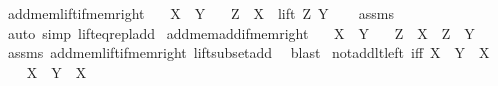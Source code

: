 \begin{isabellebody}
\endisatagproof
{\isafoldproof}%
%
\isadelimproof
\isanewline
%
\endisadelimproof
\isanewline
{}\isamarkupfalse%
\ add{\isacharunderscore}{\kern0pt}mem{\isacharunderscore}{\kern0pt}lift{\isacharunderscore}{\kern0pt}if{\isacharunderscore}{\kern0pt}mem{\isacharunderscore}{\kern0pt}right{\isacharcolon}{\kern0pt}\isanewline
\ \ \ {\isachardoublequoteopen}X\ {\isasymin}\ Y{\isachardoublequoteclose}\isanewline
\ \ \ {\isachardoublequoteopen}Z\ {\isacharplus}{\kern0pt}\ X\ {\isasymin}\ lift\ Z\ Y{\isachardoublequoteclose}\isanewline
%
\isadelimproof
\ \ %
\endisadelimproof
%
\isatagproof
{}\isamarkupfalse%
\ assms\ \isamarkupfalse%
\ {\isacharparenleft}{\kern0pt}auto\ simp{\isacharcolon}{\kern0pt}\ lift{\isacharunderscore}{\kern0pt}eq{\isacharunderscore}{\kern0pt}repl{\isacharunderscore}{\kern0pt}add{\isacharparenright}{\kern0pt}%
\endisatagproof
{\isafoldproof}%
%
\isadelimproof
\isanewline
%
\endisadelimproof
\isanewline
{}\isamarkupfalse%
\ add{\isacharunderscore}{\kern0pt}mem{\isacharunderscore}{\kern0pt}add{\isacharunderscore}{\kern0pt}if{\isacharunderscore}{\kern0pt}mem{\isacharunderscore}{\kern0pt}right{\isacharcolon}{\kern0pt}\isanewline
\ \ \ {\isachardoublequoteopen}X\ {\isasymin}\ Y{\isachardoublequoteclose}\isanewline
\ \ \ {\isachardoublequoteopen}Z\ {\isacharplus}{\kern0pt}\ X\ {\isasymin}\ Z\ {\isacharplus}{\kern0pt}\ Y{\isachardoublequoteclose}\isanewline
%
\isadelimproof
\ \ %
\endisadelimproof
%
\isatagproof
{}\isamarkupfalse%
\ assms\ add{\isacharunderscore}{\kern0pt}mem{\isacharunderscore}{\kern0pt}lift{\isacharunderscore}{\kern0pt}if{\isacharunderscore}{\kern0pt}mem{\isacharunderscore}{\kern0pt}right\ lift{\isacharunderscore}{\kern0pt}subset{\isacharunderscore}{\kern0pt}add\ \isamarkupfalse%
\ blast%
\endisatagproof
{\isafoldproof}%
%
\isadelimproof
\isanewline
%
\endisadelimproof
\isanewline
{}\isamarkupfalse%
\ not{\isacharunderscore}{\kern0pt}add{\isacharunderscore}{\kern0pt}lt{\isacharunderscore}{\kern0pt}left\ {\isacharbrackleft}{\kern0pt}iff{\isacharbrackright}{\kern0pt}{\isacharcolon}{\kern0pt}\ {\isachardoublequoteopen}{\isasymnot}{\isacharparenleft}{\kern0pt}X\ {\isacharplus}{\kern0pt}\ Y\ {\isacharless}{\kern0pt}\ X{\isacharparenright}{\kern0pt}{\isachardoublequoteclose}\isanewline
%
\isadelimproof
%
\endisadelimproof
%
\isatagproof
{}\isamarkupfalse%
\isanewline
\ \ \isamarkupfalse%
\ {\isachardoublequoteopen}X\ {\isacharplus}{\kern0pt}\ Y\ {\isacharless}{\kern0pt}\ X{\isachardoublequoteclose}\isanewline

\end{isabellebody}
